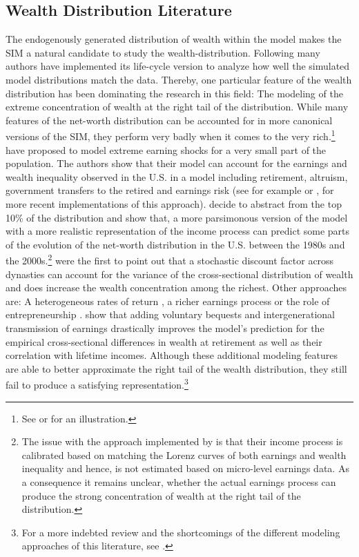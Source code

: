 \documentclass[a4paper,12pt,legno]{article}
\begin{document}
\subsection{Wealth Distribution Literature}
The endogenously generated distribution of wealth within the model makes the SIM a natural candidate to study the wealth-distribution.
Following \cite{huggett1996wealth} many authors have implemented its life-cycle version to analyze how well the simulated model distributions match the data. Thereby, one particular feature of the wealth distribution has been dominating the research in this field: The modeling of the extreme concentration of wealth at the right tail of the distribution. While many features of the net-worth distribution can be accounted for in more canonical versions of the SIM, they perform very badly when it comes to the very rich.\footnote{See \cite{huggett1996wealth} or \cite{quadrini1997understanding} for an illustration.} \\
\cite{castaneda2003} have proposed to model extreme earning shocks for a very small part of the population. The authors show that their model can account for the earnings and wealth inequality observed in the U.S. in a model including retirement, altruism, government transfers to the retired and earnings risk (see for example \cite{diaz2010} or \cite{kaymak2016evolution}, for more recent implementations of this approach). \cite{hintermaier2011} decide to abstract from the top 10\% of the distribution and show that, a more parsimonous version of the model with a more realistic representation of the income process can predict some parts of the evolution of the net-worth distribution in the U.S. between the 1980s and the 2000s.\footnote{The issue with the approach implemented by \citet{castaneda2003} is that their income process is calibrated based on matching the Lorenz curves of both earnings and wealth inequality and hence, is not estimated based on micro-level earnings data. As a consequence it remains unclear, whether the actual earnings process can produce the strong concentration of wealth at the right tail of the distribution.} \cite{krusell1998} were the first to point out that a stochastic discount factor across dynasties can account for the variance of the cross-sectional distribution of wealth and does increase the wealth concentration among the richest. Other approaches are: A heterogeneous rates of return \citep{benhabib2011distribution}, a richer earnings process \citep{denardi2016}  or the role of entrepreneurship \citep{cagetti2009}. \cite{denardi2014} show that adding voluntary bequests and intergenerational transmission of earnings drastically improves the model's prediction for the empirical cross-sectional differences in wealth at retirement as well as their correlation with lifetime incomes.  Although these additional modeling features are able to better approximate the right tail of the wealth distribution, they still fail to produce a satisfying representation.\footnote{For a more indebted review and the shortcomings of the different modeling approaches of this literature, see \cite{denardi2017}.}  \\
\end{document}
